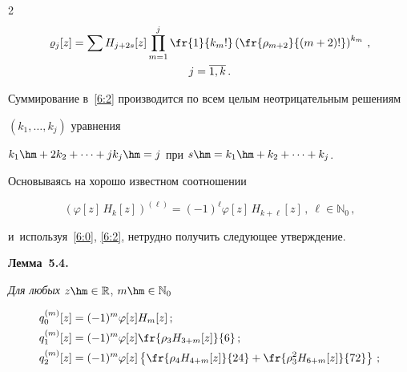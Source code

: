 \begin{multicols}{2}
\begin{multline}
 \varrho_j[z]=\sum H_{j+2s}[z] \prod_{m=1}^j


 \fr{1}{k_m !}\left(\fr{\rho_{m+2}}{(m+2)!} \right)^{k_m}\,,\\


 j=\overline{1,k}\,.


 \label{6:2}


 \end{multline}





  Суммирование в~\eqref{6:2} производится по всем целым неотрицательным решениям


  $(k_1,\ldots,k_j)$ уравнения


 $k_1\hm+2k_2+\cdots+j k_j\hm=j$ при $s\hm=k_1\hm+k_2+\cdots+k_j$.





 Основываясь на хорошо известном соотношении


 \begin{equation*}


 \left(\varphi[z]\,H_k[z]\right)^{(\ell)}=(-1)^\ell


 \varphi[z]\,H_{k+\ell}[z]\,,\ \ell\in \mathbb{N}_0\,,




 \end{equation*}


 и~используя~\eqref{6:0}, \eqref{6:2}, нетрудно получить следу\-ющее утверждение.





\smallskip





\noindent


\textbf{Лемма~5.4.}\


\textit{Для любых} $z\hm\in\mathbb{R}$, $m\hm\in\Np_0$


 \begin{align*}


  q_0^{(m)}[z]&=(-1)^m\varphi[z]H_m[z]\,;\\


  q_1^{(m)}[z]&=(-1)^m\varphi[z]\fr{\rho_3 H_{3+m}[z]}{6}\,;\\


 q_2^{(m)}[z]&=(-1)^m \varphi[z]\left\{


 \fr{\rho_4 H_{4+m}[z]}{24}+\fr{\rho_3^2 H_{6+m}[z]}{72}


 \right\}\,;\\



\end{align*}
\end{multicols}
